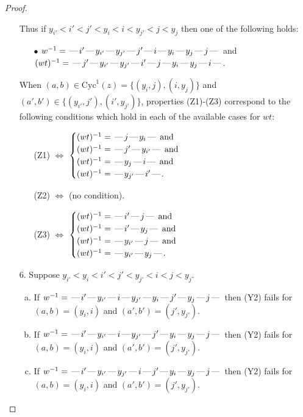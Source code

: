 \documentclass[10pt]{article}
\theoremstyle{definition}
\theoremstyle{definition}
\def\dash{\text{\hspace{0.5mm}---\hspace{0.5mm}}}
\def\Cyc{\mathrm{Cyc}}
\begin{document}
\begin{proof}
\begin{enumerate}
Thus if $y_{i'} < i' < j' < y_i < i < y_{j'} < j < y_j$ then one of the following holds:
\begin{enumerate}
\item[$\bullet$] $w^{-1} = \dash i'\dash y_{i'}\dash y_{j'}\dash j'\dash i\dash y_i\dash y_j\dash j\dash $ and $(wt)^{-1} = \dash j'\dash y_{i'}\dash y_{j'}\dash i'\dash j\dash y_i\dash y_j\dash i\dash $.
\end{enumerate}
When $(a,b)\in\Cyc^1(z)=\{(y_i,j),(i,y_j)\}$ and $(a',b')\in\{(y_{i'},j'),(i',y_{j'})\}$,
properties (Z1)-(Z3) correspond to the following conditions which
hold in each of the available cases for $wt$:
\begin{enumerate}
\item[](Z1) $\Leftrightarrow$ $\begin{cases}\text{$(wt)^{-1} = \dash j \dash y_i \dash$}\text{ and }\\
\text{$(wt)^{-1} = \dash j' \dash y_{i'} \dash$}\text{ and }\\
\text{$(wt)^{-1} = \dash y_j \dash i \dash$}\text{ and }\\
\text{$(wt)^{-1} = \dash y_{j'} \dash i' \dash$}.\end{cases}$
\item[](Z2) $\Leftrightarrow$ (no condition).
\item[](Z3) $\Leftrightarrow$ $\begin{cases}\text{$(wt)^{-1} = \dash i' \dash j \dash$}\text{ and }\\
\text{$(wt)^{-1} = \dash i' \dash y_j \dash$}\text{ and }\\
\text{$(wt)^{-1} = \dash y_{i'} \dash j \dash$}\text{ and }\\
\text{$(wt)^{-1} = \dash y_{i'} \dash y_j \dash$}.\end{cases}$
\end{enumerate}
\item[$6$.] Suppose $y_{i'} < y_i < i' < j' < y_{j'} < i < j < y_j$.
\begin{enumerate}[(a)]
\item If $w^{-1} = \dash i'\dash y_{i'}\dash i\dash y_{j'}\dash y_i\dash j'\dash y_j\dash j\dash $ then (Y2) fails for $(a,b)=(y_i,i)$ and $(a',b')=(j',y_{j'})$.
\item If $w^{-1} = \dash i'\dash y_{i'}\dash i\dash y_{j'}\dash j'\dash y_i\dash y_j\dash j\dash $ then (Y2) fails for $(a,b)=(y_i,i)$ and $(a',b')=(j',y_{j'})$.
\item If $w^{-1} = \dash i'\dash y_{i'}\dash y_{j'}\dash i\dash j'\dash y_i\dash y_j\dash j\dash $ then (Y2) fails for $(a,b)=(y_i,i)$ and $(a',b')=(j',y_{j'})$.

\end{enumerate}
\end{enumerate}
\end{proof}
\end{document}
